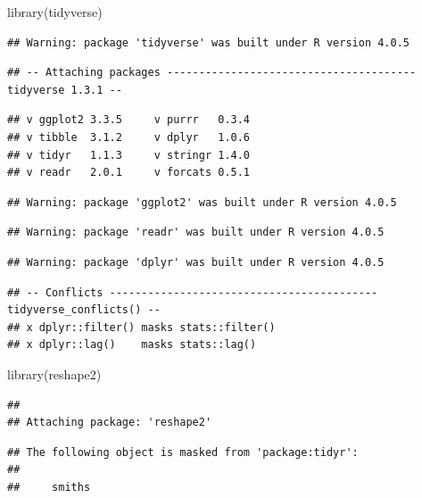 \documentclass[
]{book}
\newenvironment{Shaded}{\begin{snugshade}}{\end{snugshade}}
\newcommand{\FunctionTok}[1]{\textcolor[rgb]{0.00,0.00,0.00}{#1}}
\newcommand{\NormalTok}[1]{#1}
\begin{document}
\begin{Shaded}
\begin{Highlighting}[]
\FunctionTok{library}\NormalTok{(tidyverse)}
\end{Highlighting}
\end{Shaded}

\begin{verbatim}
## Warning: package 'tidyverse' was built under R version 4.0.5
\end{verbatim}

\begin{verbatim}
## -- Attaching packages --------------------------------------- tidyverse 1.3.1 --
\end{verbatim}

\begin{verbatim}
## v ggplot2 3.3.5     v purrr   0.3.4
## v tibble  3.1.2     v dplyr   1.0.6
## v tidyr   1.1.3     v stringr 1.4.0
## v readr   2.0.1     v forcats 0.5.1
\end{verbatim}

\begin{verbatim}
## Warning: package 'ggplot2' was built under R version 4.0.5
\end{verbatim}

\begin{verbatim}
## Warning: package 'readr' was built under R version 4.0.5
\end{verbatim}

\begin{verbatim}
## Warning: package 'dplyr' was built under R version 4.0.5
\end{verbatim}

\begin{verbatim}
## -- Conflicts ------------------------------------------ tidyverse_conflicts() --
## x dplyr::filter() masks stats::filter()
## x dplyr::lag()    masks stats::lag()
\end{verbatim}

\begin{Shaded}
\begin{Highlighting}[]
\FunctionTok{library}\NormalTok{(reshape2)}
\end{Highlighting}
\end{Shaded}

\begin{verbatim}
## 
## Attaching package: 'reshape2'
\end{verbatim}

\begin{verbatim}
## The following object is masked from 'package:tidyr':
## 
##     smiths
\end{verbatim}
\end{document}
